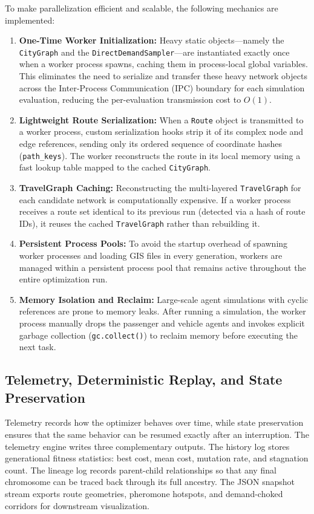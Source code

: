 {{To make parallelization efficient and scalable, the following mechanics are implemented:
\begin{enumerate}
    \item \textbf{One-Time Worker Initialization:} Heavy static objects—namely the \texttt{CityGraph} and the \texttt{DirectDemandSampler}—are instantiated exactly once when a worker process spawns, caching them in process-local global variables. This eliminates the need to serialize and transfer these heavy network objects across the Inter-Process Communication (IPC) boundary for each simulation evaluation, reducing the per-evaluation transmission cost to $O(1)$.
    \item \textbf{Lightweight Route Serialization:} When a \texttt{Route} object is transmitted to a worker process, custom serialization hooks strip it of its complex node and edge references, sending only its ordered sequence of coordinate hashes (\texttt{path\_keys}). The worker reconstructs the route in its local memory using a fast lookup table mapped to the cached \texttt{CityGraph}.
    \item \textbf{TravelGraph Caching:} Reconstructing the multi-layered \texttt{TravelGraph} for each candidate network is computationally expensive. If a worker process receives a route set identical to its previous run (detected via a hash of route IDs), it reuses the cached \texttt{TravelGraph} rather than rebuilding it.
    \item \textbf{Persistent Process Pools:} To avoid the startup overhead of spawning worker processes and loading GIS files in every generation, workers are managed within a persistent process pool that remains active throughout the entire optimization run.
    \item \textbf{Memory Isolation and Reclaim:} Large-scale agent simulations with cyclic references are prone to memory leaks. After running a simulation, the worker process manually drops the passenger and vehicle agents and invokes explicit garbage collection (\texttt{gc.collect()}) to reclaim memory before executing the next task.
\end{enumerate}

\subsection{Telemetry, Deterministic Replay, and State Preservation}
\label{sec:telemetry}
\noindent
Telemetry records how the optimizer behaves over time, while state preservation ensures that the same behavior can be resumed exactly after an interruption. The telemetry engine writes three complementary outputs. The history log stores generational fitness statistics: best cost, mean cost, mutation rate, and stagnation count. The lineage log records parent-child relationships so that any final chromosome can be traced back through its full ancestry. The \ac{JSON} snapshot stream exports route geometries, pheromone hotspots, and demand-choked corridors for downstream visualization.

}}
